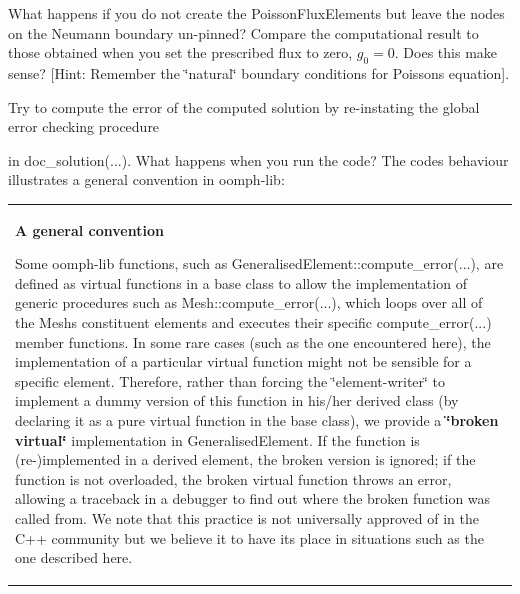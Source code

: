 \begin{DoxyEnumerate}
\item What happens if you do not create the {\ttfamily Poisson\+Flux\+Elements} but leave the nodes on the Neumann boundary un-\/pinned? Compare the computational result to those obtained when you set the prescribed flux to zero, $ g_0 = 0 $. Does this make sense? \mbox{[}Hint\+: Remember the \char`\"{}natural\char`\"{} boundary conditions for Poisson\textquotesingle{}s equation\mbox{]}.
\item Try to compute the error of the computed solution by re-\/instating the global error checking procedure 
 in {\ttfamily doc\+\_\+solution}(...). What happens when you run the code? The code\textquotesingle{}s behaviour illustrates a general convention in {\ttfamily oomph-\/lib}\+: \tabulinesep=1mm
\begin{longtabu} spread 0pt [c]{*{1}{|X[-1]}|}
\hline
\begin{center}{\bfseries \label{index_broken_virtual}%
%
A general convention}\end{center}  Some {\ttfamily oomph-\/lib} functions, such as {\ttfamily Generalised\+Element\+::compute\+\_\+error}(...), are defined as virtual functions in a base class to allow the implementation of generic procedures such as {\ttfamily Mesh\+::compute\+\_\+error}(...), which loops over all of the {\ttfamily Mesh\textquotesingle{}s} constituent elements and executes their specific {\ttfamily compute\+\_\+error}(...) member functions. In some rare cases (such as the one encountered here), the implementation of a particular virtual function might not be sensible for a specific element. Therefore, rather than forcing the \char`\"{}element-\/writer\char`\"{} to implement a dummy version of this function in his/her derived class (by declaring it as a pure virtual function in the base class), we provide a {\bfseries  \char`\"{}broken virtual\char`\"{} } implementation in {\ttfamily Generalised\+Element}. If the function is (re-\/)implemented in a derived element, the broken version is ignored; if the function is not overloaded, the broken virtual function throws an error, allowing a traceback in a debugger to find out where the broken function was called from. We note that this practice is not universally approved of in the C++ community but we believe it to have its place in situations such as the one described here. ~\newline

\end{longtabu}
\end{DoxyEnumerate}
